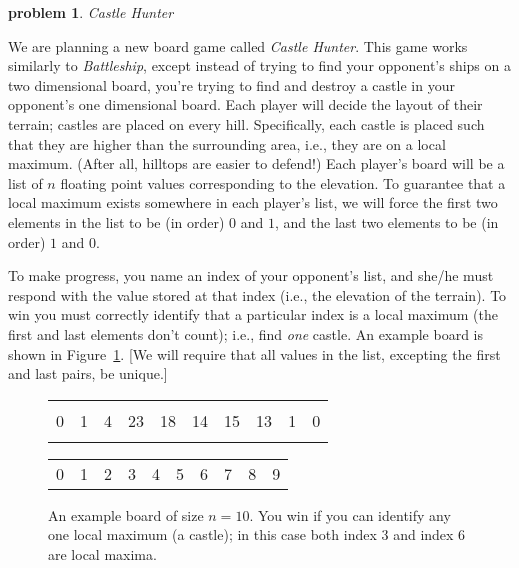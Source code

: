 \documentclass[10pt]{article}
\newtheorem{problem}{\sc\color{cit}problem}
\begin{document}
\begin{problem} Castle Hunter \end{problem}
    We are planning a new board game called \textit{Castle Hunter}. This game works similarly to \textit{Battleship}, except instead of trying to find your opponent's ships on a two dimensional board, you're trying to find and destroy a castle in your opponent's one dimensional board.  Each player will decide the layout of their terrain; castles are placed on every hill.  Specifically, each castle is placed such that they are higher than the surrounding area, i.e., they are on a local maximum.  (After all, hilltops are easier to defend!)  Each player's board will be a list of $n$ floating point values corresponding to the elevation. To guarantee that a local maximum exists somewhere in each player's list, we will force the first two elements in the list to be (in order) $0$ and $1$, and the last two elements to be (in order) $1$ and $0$. 

To make progress, you name an index of your opponent's list, and she/he must respond with the value stored at that index (i.e., the elevation of the terrain). To win you must correctly identify that a particular index is a local maximum (the first and last elements don't count); i.e., find \emph{one} castle. An example board is shown in Figure~\ref{fig:board}. [We will require that all values in the list, excepting the first and last pairs, be unique.]

\begin{figure}[h]
    \centering
        \begin{tabularx}{0.7\textwidth}{ | *{10}{Y|} }
                \hline
                  &   &   &    &    &    &    &    &   & \\
                0 & 1 & 4 & 23 & 18 & 14 & 15 & 13 & 1 & 0\\
                  &   &   &    &    &    &    &    &   & \\
                \hline
        \end{tabularx}
        {\small\begin{tabularx}{0.7\textwidth}{  *{10}{Y} }
                0 & 1 & 2 & 3 & 4 & 5 & 6 & 7 & 8 & 9
        \end{tabularx}}

    \caption{An example board of size $n=10$. You win if you can identify any one local maximum (a castle); in this case both index $3$ and index $6$ are local maxima.}
    \label{fig:board}
\end{figure}
\end{document}

